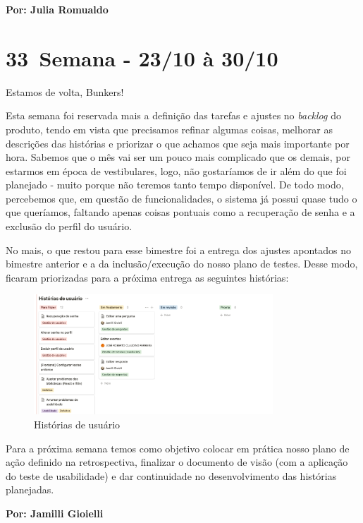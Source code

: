 \textbf{Por: Julia Romualdo}

\section{33\textordfeminine \, Semana - 23/10 à 30/10}
Estamos de volta, Bunkers!

Esta semana foi reservada mais a definição das tarefas e ajustes no \textit{backlog} do produto, tendo em vista que precisamos refinar algumas coisas, melhorar as descrições das histórias e priorizar o que achamos que seja mais importante por hora. Sabemos que o mês vai ser um pouco mais complicado que os demais, por estarmos em época de vestibulares, logo, não gostaríamos de ir além do que foi planejado - muito porque não teremos tanto tempo disponível. De todo modo, percebemos que, em questão de funcionalidades, o sistema já possui quase tudo o que queríamos, faltando apenas coisas pontuais como a recuperação de senha e a exclusão do perfil do usuário. 

No mais, o que restou para esse bimestre foi a entrega dos ajustes apontados no bimestre anterior e a da inclusão/execução do nosso plano de testes. Desse modo, ficaram priorizadas para a próxima entrega as seguintes histórias:

\begin{figure}[htb]
        \centering
        \caption{Histórias de usuário}
        \includegraphics[width=0.8\textwidth]{anexos/Imagens_Blog/historias-notion.png}
        \end{figure}
        \FloatBarrier

Para a próxima semana temos como objetivo colocar em prática nosso plano de ação definido na retrospectiva, finalizar o documento de visão (com a aplicação do teste de usabilidade) e dar continuidade no desenvolvimento das histórias planejadas.

\textbf{Por: Jamilli Gioielli}